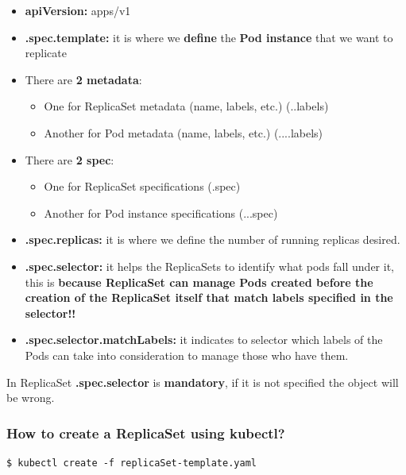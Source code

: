 \documentclass{article}
\newenvironment{blocktemplateIII}[1]{%
    \tcolorbox[beamer,%
    noparskip,breakable,
    ,colframe=Red,%
    colbacklower=LimeGreen!75!LightGreen,%
    title=#1]}%
    {\endtcolorbox}
\newenvironment{codetemplate}[1][]{%
  \mybasecolorbox[#1]
  \itshape
}{%
  \endmybasecolorbox
}
\begin{document}
\begin{itemize}
    \item \textbf{apiVersion:} apps/v1
    \item \textbf{.spec.template:} it is where we \textbf{define} the \textbf{Pod instance} that we want to replicate
    \item There are \textbf{2 metadata}:
    \begin{itemize}
        \item One for ReplicaSet metadata (name, labels, etc.) (..labels)
        \item Another for Pod metadata (name, labels, etc.) (....labels)
    \end{itemize}
    \item There are \textbf{2 spec}:
    \begin{itemize}
        \item One for ReplicaSet specifications (.spec)
        \item Another for Pod instance specifications (...spec)
    \end{itemize}
    \item \textbf{.spec.replicas:} it is where we define the number of running replicas desired.
    \item \textbf{.spec.selector:} it helps the ReplicaSets to identify what pods fall under it, this is \textbf{because ReplicaSet can manage Pods created before the creation of the ReplicaSet itself  that match labels specified in the selector!!}
    \item \textbf{.spec.selector.matchLabels:} it indicates to selector which labels of the Pods can take into consideration to manage those who have them.
\end{itemize}

\begin{blocktemplateIII}{Note}
In ReplicaSet \textbf{.spec.selector} is \textbf{mandatory}, if it is not specified the object will be wrong.
\end{blocktemplateIII}

\subsubsection{How to create a ReplicaSet using kubectl?}

\begin{codetemplate}
\begin{verbatim}
$ kubectl create -f replicaSet-template.yaml
\end{verbatim}
\end{codetemplate}
\end{document}
